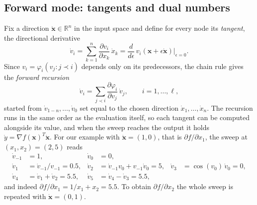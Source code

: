 \subsection{Forward mode: tangents and dual numbers}
\label{sec:adforward}

Fix a direction $\dot{\bm{x}}\in\mathbb{R}^{n}$ in the input space and define
for every node its \emph{tangent}, the directional derivative
\begin{equation}
  \dot v_i = \sum_{k=1}^{n}\frac{\partial v_i}{\partial x_k}\,\dot x_k
           = \frac{d}{d\epsilon}\,v_i(\bm{x}+\epsilon\dot{\bm{x}})\Big|_{\epsilon=0}.
  \label{eq:4-tangentdef}
\end{equation}
Since $v_i=\varphi_i(v_j:j\prec i)$ depends only on its predecessors, the
chain rule gives the \emph{forward recursion}
\begin{equation}
  \dot v_i = \sum_{j\prec i}\frac{\partial\varphi_i}{\partial v_j}\,\dot v_j ,
  \qquad i=1,\dots,\ell,
  \label{eq:4-forwardrec}
\end{equation}
started from $\dot v_{1-n},\dots,\dot v_0$ set equal to the chosen direction
$\dot x_1,\dots,\dot x_n$.  The recursion runs in the same order as the
evaluation itself, so each tangent can be computed alongside its value, and
when the sweep reaches the output it holds $\dot y=\nabla f(\bm{x})^{T}\dot{\bm{x}}$.
For our example with $\dot{\bm{x}}=(1,0)$, that is $\partial f/\partial x_1$,
the sweep at $(x_1,x_2)=(2,5)$ reads
\begin{equation}
  \begin{aligned}
    \dot v_{-1} &= 1, & \dot v_0 &= 0,\\
    \dot v_1 &= \dot v_{-1}/v_{-1} = 0.5, &
    \dot v_2 &= \dot v_{-1}v_0 + v_{-1}\dot v_0 = 5, &
    \dot v_3 &= \cos(v_0)\,\dot v_0 = 0,\\
    \dot v_4 &= \dot v_1+\dot v_2 = 5.5, &
    \dot v_5 &= \dot v_4-\dot v_3 = 5.5 ,
  \end{aligned}
  \label{eq:4-forwardsweep}
\end{equation}
and indeed $\partial f/\partial x_1 = 1/x_1 + x_2 = 5.5$.  To obtain
$\partial f/\partial x_2$ the whole sweep is repeated with
$\dot{\bm{x}}=(0,1)$.

